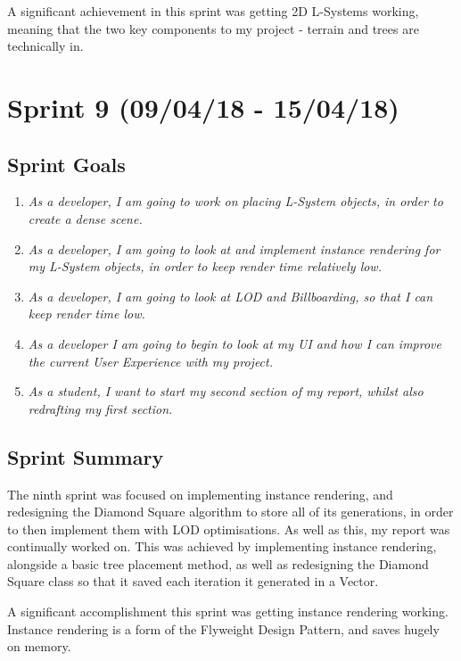 \documentclass[a4paper,10pt]{report}
\begin{document}
A significant achievement in this sprint was getting 2D L-Systems working, meaning that the two key components to my project - terrain and trees are technically in. 


\clearpage
\section{Sprint 9 (09/04/18 -  15/04/18)}

\subsection{Sprint Goals}
\begin{enumerate}
    \item \textit{ As a developer, I am going to work on placing L-System objects, in order to create a dense scene.}

    \item \textit{ As a developer, I am going to look at and implement instance rendering for my L-System objects, in order to keep render time relatively low.}

    \item \textit{ As a developer, I am going to look at LOD and Billboarding, so that I can keep render time low.}

    \item \textit{ As a developer I am going to begin to look at my UI and how I can improve the current User Experience with my project.}

    \item \textit{ As a student, I want to start my second section of my report, whilst also redrafting my first section. }
\end{enumerate}


\subsection{Sprint Summary}

The ninth sprint was focused on implementing instance rendering, and redesigning the Diamond Square algorithm to store all of its generations, in order to then implement them with LOD optimisations. As well as this, my report was continually worked on. This was achieved by implementing instance rendering, alongside a basic tree placement method, as well as redesigning the Diamond Square class so that it saved each iteration it generated in a Vector. \medskip

A significant accomplishment this sprint was getting instance rendering working. Instance rendering is a form of the Flyweight Design Pattern, and saves hugely on memory.
\end{document}
